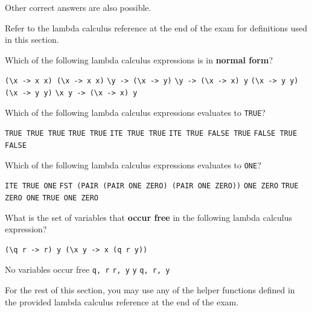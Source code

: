 \documentclass[addpoints,answers]{exam}
\begin{document}
\begin{questions}
\begin{solutionorbox}[\stretch{1}]
Other correct answers are also possible.
\end{solutionorbox}

\newpage

Refer to the lambda calculus reference at the end of the exam for definitions used in this section.

\question[6] Which of the following lambda calculus expressions is in \textbf{normal form}?

\begin{checkboxes}
  \choice \verb|(\x -> x x) (\x -> x x)|
  \CorrectChoice \verb|\y -> (\x -> y)|
  \choice \verb|\y -> (\x -> x) y|
  \choice \verb|(\x -> y y) (\x -> y y)|
  \choice \verb|\x y -> (\x -> x) y|
\end{checkboxes}

\question[6] Which of the following lambda calculus expressions evaluates to \texttt{TRUE}?

\begin{checkboxes}
  \CorrectChoice \texttt{TRUE TRUE TRUE}
  \choice \texttt{TRUE TRUE}
  \choice \texttt{ITE TRUE TRUE}
  \choice \texttt{ITE TRUE FALSE TRUE}
  \choice \texttt{FALSE TRUE FALSE}
\end{checkboxes}

\question[6] Which of the following lambda calculus expressions evaluates to \texttt{ONE}?

\begin{checkboxes}
  \choice \texttt{ITE TRUE ONE}
  \choice \texttt{FST (PAIR (PAIR ONE ZERO) (PAIR ONE ZERO))}
  \choice \texttt{ONE ZERO}
  \choice \texttt{TRUE ZERO ONE}
  \CorrectChoice \texttt{TRUE ONE ZERO}
\end{checkboxes}

\question[6] What is the set of variables that \textbf{occur free} in the following lambda calculus expression?

\begin{verbatim}
(\q r -> r) y (\x y -> x (q r y))
\end{verbatim}

\begin{checkboxes}
  \choice No variables occur free
  \choice \texttt{q, r}
  \choice \texttt{r, y}
  \choice \texttt{y}
  \CorrectChoice \texttt{q, r, y}
\end{checkboxes}

\newpage

For the rest of this section, you may use any of the helper functions defined in the provided lambda calculus reference at the end of the exam.


\end{questions}
\end{document}
